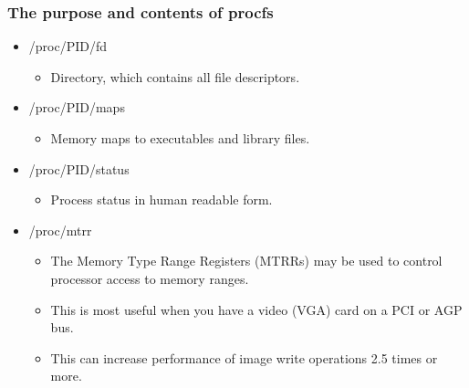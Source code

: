 \begin{frame}[fragile]
    \frametitle{The purpose and contents of procfs}


    \begin{itemize}
        \item /proc/PID/fd
	    \begin{itemize}
	        \item Directory,  which contains all file descriptors.
      \end{itemize}
        \item /proc/PID/maps
	    \begin{itemize}
	        \item Memory  maps to executables and library files.
      \end{itemize}
        \item /proc/PID/status
	    \begin{itemize}
	        \item Process  status in human readable form.
      \end{itemize}
        \item /proc/mtrr
	    \begin{itemize}
	        \item The Memory Type Range Registers (MTRRs) may be used to control processor  access to memory ranges.
          \item This is most useful when you have a video (VGA)  card on a PCI or AGP bus.
          \item This can increase performance of image write operations 2.5  times or more.
      \end{itemize}
    \end{itemize}
% 
\end{frame}
